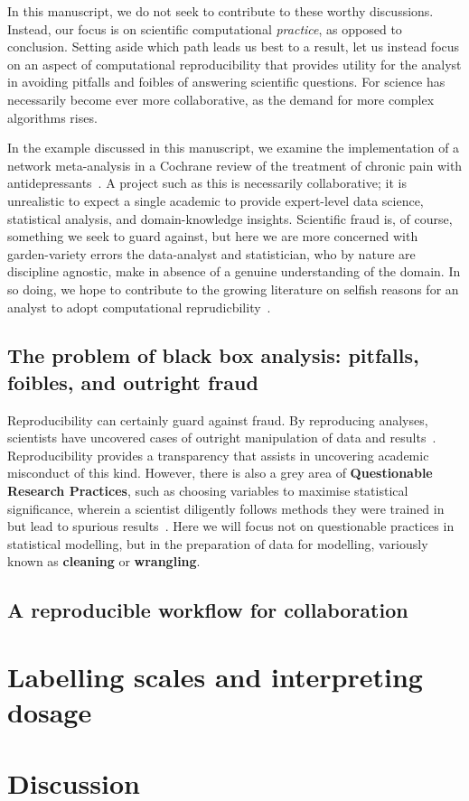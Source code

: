 \documentclass{article}
\begin{document}
In this manuscript, we do not seek to contribute to these worthy discussions. Instead, our focus is on scientific computational \emph{practice}, as opposed to conclusion. Setting aside which path leads us best to a result, let us instead focus on an aspect of computational reproducibility that provides utility for the analyst in avoiding pitfalls and foibles of answering scientific questions. For science has necessarily become ever more collaborative, as the demand for more complex algorithms rises. 

In the example discussed in this manuscript, we examine the implementation of a network meta-analysis in a Cochrane review of the treatment of chronic pain with antidepressants~\cite{birkinshaw_2021}. A project such as this is necessarily collaborative; it is unrealistic to expect a single academic to provide expert-level data science, statistical analysis, and domain-knowledge insights. Scientific fraud is, of course, something we seek to guard against, but here we are more concerned with garden-variety errors the data-analyst and statistician, who by nature are discipline agnostic, make in absence of a genuine understanding of the domain. In so doing, we hope to contribute to the growing literature on selfish reasons for an analyst to adopt computational reprudicbility~\cite{markowetz_2015}.

\subsection{The problem of black box analysis: pitfalls, foibles, and outright fraud}

Reproducibility can certainly guard against fraud. By reproducing analyses, scientists have uncovered cases of outright manipulation of data and results~\cite{baggerly_2009, schleunes_2020}. Reproducibility provides a transparency that assists in uncovering academic misconduct of this kind. However, there is also a grey area of \textbf{Questionable Research Practices}, such as choosing variables to maximise statistical significance, wherein a scientist diligently follows methods they were trained in but lead to spurious results~\cite{fraser_questionable_2018}. Here we will focus not on questionable practices in statistical modelling, but in the preparation of data for modelling, variously known as \textbf{cleaning} or \textbf{wrangling}.




\subsection{A reproducible workflow for collaboration}

\section{Labelling scales and interpreting dosage}

\section{Discussion}




\end{document}

